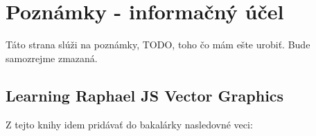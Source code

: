 \section{Poznámky - informačný účel}
Táto strana slúži na poznámky, TODO, toho čo mám ešte urobiť. 
Bude samozrejme zmazaná.  


\subsection{Learning Raphael JS Vector Graphics}
Z tejto knihy idem pridávať do bakalárky nasledovné veci:







